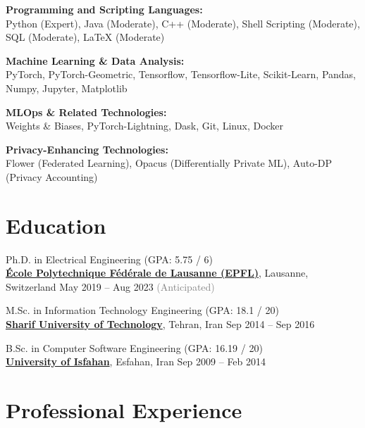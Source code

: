 \documentclass[11pt]{article}
\begin{document}
\begin{outerlist}
	\item \textbf{Programming and Scripting Languages:}\\
	{Python (Expert), Java (Moderate), C++ (Moderate), Shell Scripting (Moderate), SQL (Moderate), LaTeX (Moderate)}

	\item \textbf{Machine Learning \& Data Analysis:}\\
	{PyTorch, PyTorch-Geometric, Tensorflow, Tensorflow-Lite, Scikit-Learn, Pandas, Numpy, Jupyter, Matplotlib}

	\item \textbf{MLOps \& Related Technologies:}\\
	{Weights \& Biases, PyTorch-Lightning, Dask, Git, Linux, Docker}

	\item \textbf{Privacy-Enhancing Technologies:}\\
	{Flower (Federated Learning), Opacus (Differentially Private ML), Auto-DP (Privacy Accounting)}

\end{outerlist}


\section{Education}
\begin{outerlist}

	\item Ph.D. in Electrical Engineering (GPA: 5.75 / 6)\\
	\href{https://www.epfl.ch/en/home/}{\textbf{École Polytechnique Fédérale de Lausanne (EPFL)}}, Lausanne, Switzerland \hfill {May 2019 -- Aug 2023 \textcolor{gray}{(Anticipated)}}

	\item M.Sc. in Information Technology Engineering (GPA: 18.1 / 20)\\
	\href{http://www.en.sharif.edu/}{\textbf{Sharif University of Technology}}, Tehran, Iran \hfill {Sep 2014 -- Sep 2016}

	\item B.Sc. in Computer Software Engineering (GPA: 16.19 / 20)\\
	\href{http://ui.ac.ir/EN}{\textbf{University of Isfahan}}, Esfahan, Iran \hfill {Sep 2009 -- Feb 2014}

\end{outerlist}


\section{Professional Experience}
\end{document}
